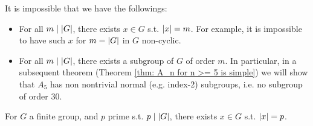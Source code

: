 It is impossible that we have the followings:
\begin{itemize}
    \item For all $m \mid \left|G\right|$, there exists $x \in G$ s.t. $\left|x\right| = m$. For example, it is impossible to have such $x$ for $m = \left|G\right|$ in $G$ non-cyclic.
    \item For all $m \mid \left|G\right|$, there exists a subgroup of $G$ of order $m$. In particular, in a subsequent theorem (Theorem \ref{thm: A_n for n >= 5 is simple}) we will show that $A_5$ has non nontrivial normal (e.g. index-2) subgroups, i.e. no subgroup of order 30.
\end{itemize}

\begin{theorem}[Cauchy]\label{thm: Cauchy}
    For $G$ a finite group, and $p$ prime s.t. $p \mid \left|G\right|$, there exists $x \in G$ s.t. $\left|x\right| = p$.
\end{theorem}


